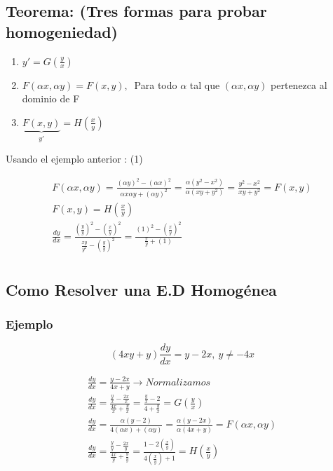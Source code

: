 \documentclass{article}
\begin{document}
\subsection{Teorema: (Tres formas para probar homogeniedad)}

\begin{enumerate}
\item $y' = G \left( \frac{y}{x} \right)$
\item $ F \left( \alpha x ,\alpha y \right) = F \left( x,y \right), \ $ Para todo $\alpha$ tal que $\left( \alpha x, \alpha y \right)$ pertenezca al dominio de F
\item $ \underbrace{F (x,y)}_{y'} = H \left( \frac{x}{y} \right) $ 
\end{enumerate}

Usando el ejemplo anterior : (1)

\begin{eqnarray}
\nonumber F \left( \alpha x ,\alpha y \right) = \frac{(\alpha y)^2-(\alpha x)^2}{\alpha x \alpha y+ (\alpha y)^2} = \frac{\alpha \left( y^2-x^2 \right)}{\alpha \left( xy+y^2 \right)} = \frac{y^2-x^2}{xy+y^2} = F(x,y) \\
\nonumber F(x,y) = H \left( \frac{x}{y} \right) \\
\nonumber \frac{dy}{dx} = \frac{\left(\frac{y}{y} \right)^2 - \left( \frac{x}{y} \right)^2 }{\frac{xy}{y^2} - \left( \frac{y}{y} \right)^2} =  \frac{\left( 1 \right)^2 - \left( \frac{x}{y} \right)^2 }{\frac{x}{y} + \left( 1 \right)}  \\
\end{eqnarray}

\subsection{Como Resolver una E.D Homogénea}

\subsubsection{Ejemplo}
\begin{equation}
\left(4xy +y \right) \frac{dy}{dx} = y-2x, \ y \neq -4x
\end{equation}

\begin{eqnarray}
\nonumber \frac{dy}{dx} = \frac{y-2x}{4x + y} \rightarrow Normalizamos \\
\nonumber \frac{dy}{dx} = \frac{\frac{y}{x}-\frac{2x}{x}}{\frac{4x}{x} + \frac{y}{x}} = \frac{\frac{y}{x}-2}{4 + \frac{y}{x}}  = G \left(\frac{y}{x} \right)  \\
\nonumber \frac{dy}{dx} = \frac{\alpha (y-2)} {4 (\alpha x) + (\alpha y)} = \frac{ \alpha (y-2x) }{\alpha (4x + y)} = F( \alpha x, \alpha y)  \\
\nonumber \frac{dy}{dx} = \frac{\frac{y}{y}-\frac{2x}{y}}{\frac{4x}{y}+ \frac{y}{y}} = \frac{1-2\left( \frac{x}{y} \right)}{4 \left( \frac{x}{y} \right) +1}  = H \left( \frac{x}{y} \right)\\
\end{eqnarray}
\end{document}
